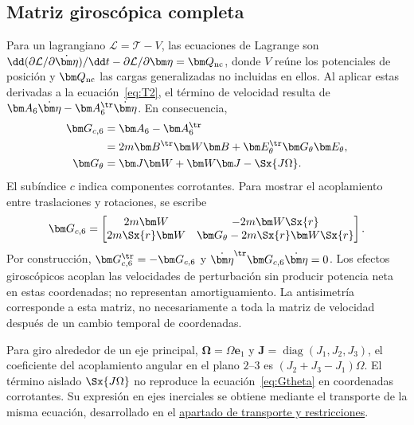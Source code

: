 \subsection{Matriz giroscópica completa}
Para un lagrangiano $\mathcal L=\mathcal T-V$, las ecuaciones de Lagrange son
$\dd(\partial\mathcal L/\partial\dot{\bm\eta})/\dd t-\partial\mathcal L/\partial\bm\eta=\bm Q_{\rm nc}$,
donde $V$ reúne los potenciales de posición y $\bm Q_{\rm nc}$ las cargas generalizadas no incluidas en ellos. Al aplicar estas derivadas a la ecuación~\eqref{eq:T2}, el término de velocidad resulta de $\bm A_6\dot{\bm\eta}-\bm A_6^\tr\dot{\bm\eta}$. En consecuencia,
\begin{align}
\bm G_{c,6}&=\bm A_6-\bm A_6^\tr\nonumber\\
&=2m\bm B^\tr\bm W\bm B+\bm E_\theta^\tr\bm G_\theta\bm E_\theta,\label{eq:G6}\\
\bm G_\theta&=\bm J\bm W+\bm W\bm J-\Sx{J\Omega}.
\label{eq:Gtheta}
\end{align}
El subíndice $c$ indica componentes corrotantes. Para mostrar el acoplamiento entre traslaciones y rotaciones, se escribe
\begin{equation}
\bm G_{c,6}=\begin{bmatrix}
2m\bm W&-2m\bm W\Sx{r}\\
2m\Sx{r}\bm W&\bm G_\theta-2m\Sx{r}\bm W\Sx{r}
\end{bmatrix}.
\label{eq:Gblocks}
\end{equation}
Por construcción, $\bm G_{c,6}^\tr=-\bm G_{c,6}$ y $\dot{\bm\eta}^\tr\bm G_{c,6}\dot{\bm\eta}=0$. Los efectos giroscópicos acoplan las velocidades de perturbación sin producir potencia neta en estas coordenadas; no representan amortiguamiento. La antisimetría corresponde a esta matriz, no necesariamente a toda la matriz de velocidad después de un cambio temporal de coordenadas.

Para giro alrededor de un eje principal, $\bm\Omega=\Omega\bm e_1$ y $\bm J=\operatorname{diag}(J_1,J_2,J_3)$, el coeficiente del acoplamiento angular en el plano $2$--$3$ es $(J_2+J_3-J_1)\Omega$. El término aislado $\Sx{J\Omega}$ no reproduce la ecuación~\eqref{eq:Gtheta} en coordenadas corrotantes. Su expresión en ejes inerciales se obtiene mediante el transporte de la misma ecuación, desarrollado en el \hyperref[sec:transporte]{apartado de transporte y restricciones}.

